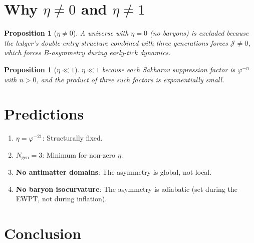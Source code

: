 \documentclass[12pt,a4paper]{article}
\newtheorem{proposition}[theorem]{Proposition}
\theoremstyle{definition}
\theoremstyle{remark}
\begin{document}
\section{Why $\eta \neq 0$ and $\eta \neq 1$}
\label{sec:why}

\begin{proposition}[$\eta \neq 0$]
A universe with $\eta = 0$ (no baryons) is excluded because the
ledger's double-entry structure combined with three generations
forces $\mathcal{J} \neq 0$, which forces $B$-asymmetry during
early-tick dynamics.
\end{proposition}

\begin{proposition}[$\eta \ll 1$]
$\eta \ll 1$ because each Sakharov suppression factor is
$\varphi^{-n}$ with $n > 0$, and the product of three such
factors is exponentially small.
\end{proposition}

\section{Predictions}
\label{sec:predictions}

\begin{enumerate}
  \item \textbf{$\eta = \varphi^{-21}$}: Structurally fixed.

  \item \textbf{$N_{\mathrm{gen}} = 3$}: Minimum for non-zero
  $\eta$.

  \item \textbf{No antimatter domains}: The asymmetry is global,
  not local.

  \item \textbf{No baryon isocurvature}: The asymmetry is adiabatic
  (set during the EWPT, not during inflation).
\end{enumerate}

\section{Conclusion}
\label{sec:conclusion}
\end{document}
